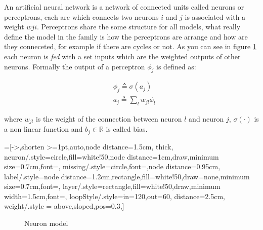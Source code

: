  
An artificial neural network is a network of connected units called neurons or perceptrons, each arc which connects two neurons $i$ and $j$ is associated with a weight $wji$. Perceptrons share the some
structure for all models, what really define the model in the family is how the perceptrons are arrange and how are they conneceted, for example if there are cycles or not.
As you can see in figure \ref{neuron_model} each neuron is \textit{fed} with a set inputs which are the weighted outputs of other neurons. Formally the output of a perceptron $\phi_j$
is defined as:
 
\begin{align}
&\phi_j \triangleq \sigma(a_j)\\
&a_j \triangleq \sum_l w_{jl}\phi_l
\end{align}

where $w_{jl}$ is the weight of the connection between neuron $l$ and neuron $j$, $\sigma(\cdot)$ is a non linear function and $b_j \in \mathbb{R}$ is called bias.


=[->,shorten >=1pt,auto,node distance=1.5cm,
  thick,
  neuron/.style={circle,fill=white!50,node distance=1cm,draw,minimum size=0.7cm,font=\sffamily\normalsize},
  missing/.style={circle,font=\sffamily\Large,node distance=0.95cm},
  label/.style={node distance=1.2cm,rectangle,fill=white!50,draw=none,minimum size=0.7cm,font=\sffamily\normalsize},
  layer/.style={rectangle,fill=white!50,draw,minimum width=1.5cm,font=\sffamily\Large},
  loopStyle/.style={in=120,out=60, distance=2.5cm},
  weight/.style = {above,sloped,pos=0.3},]
\begin{figure}[]
 \centering
{}
\caption{Neuron model}
\label{neuron_model}
\end{figure}


